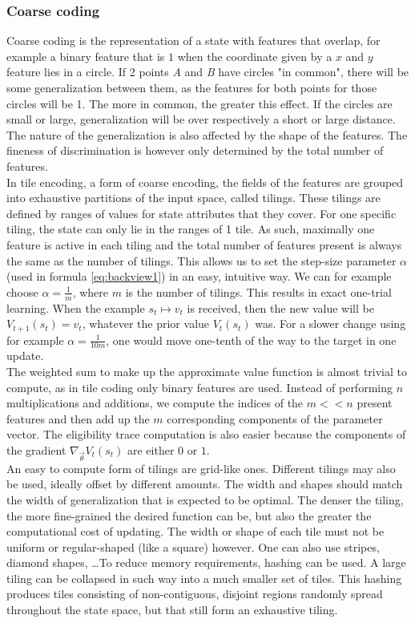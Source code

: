 \documentclass[a4paper]{article}
\begin{document}
\subsubsection{Coarse coding}
Coarse coding is the representation of a state with features that overlap, for example a binary feature that is $1$ when the coordinate given by a $x$ and $y$ feature lies in a circle. If 2 points \textit{A} and \textit{B} have circles "in common", there will be some generalization between them, as the features for both points for those circles will be 1. The more in common, the greater this effect. If the circles are small or large, generalization will be over respectively a short or large distance. The nature of the generalization is also affected by the shape of the features. The fineness of discrimination is however only determined by the total number of features.\\
In tile encoding, a form of coarse encoding, the fields of the features are grouped into exhaustive partitions of the input space, called tilings. These tilings are defined by ranges of values for state attributes that they cover. For one specific tiling, the state can only lie in the ranges of 1 tile. As such, maximally one feature is active in each tiling and the total number of features present is always the same as the number of tilings. This allows us to set the step-size parameter $\alpha$ (used in formula \ref{eq:backview1}) in an easy, intuitive way. We can for example choose $\alpha = \frac{1}{m}$, where $m$ is the number of tilings. This results in exact one-trial learning. When the example $s_t \mapsto v_t$ is received, then the new value will be $V_{t+1}(s_t) = v_t$, whatever the prior value $V_t(s_t)$ was. For a slower change using for example $\alpha=\frac{1}{10m}$, one would move one-tenth of the way to the target in one update.\\
The weighted sum to make up the approximate value function is almost trivial to compute, as in tile coding only binary features are used. Instead of performing $n$ multiplications and additions, we compute the indices of the $m<<n$ present features and then add up the $m$ corresponding components of the parameter vector. The eligibility trace computation is also easier because the components of the gradient $\nabla_{\overrightarrow{\theta}} V_t(s_t)$ are either $0$ or $1$.\\
An easy to compute form of tilings are grid-like ones. Different tilings may also be used, ideally offset by different amounts. The width and shapes should match the width of generalization that is expected to be optimal. The denser the tiling, the more fine-grained the desired function can be, but also the greater the computational cost of updating. The width or shape of each tile must not be uniform or regular-shaped (like a square) however. One can also use stripes, diamond shapes, \dots To reduce memory requirements, hashing can be used. A large tiling can be collapsed in such way into a much smaller set of tiles. This hashing produces tiles consisting of non-contiguous, disjoint regions randomly spread throughout the state space, but that still form an exhaustive tiling.\\
\end{document}
